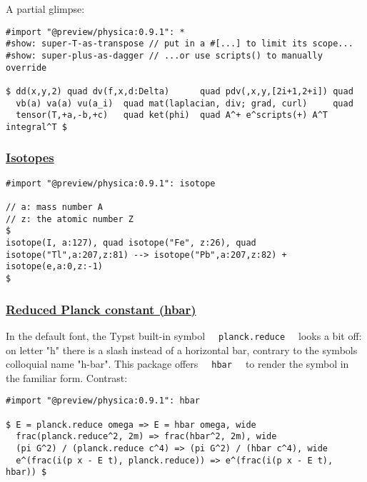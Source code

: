 A partial glimpse:

\begin{verbatim}
#import "@preview/physica:0.9.1": *
#show: super-T-as-transpose // put in a #[...] to limit its scope...
#show: super-plus-as-dagger // ...or use scripts() to manually override

$ dd(x,y,2) quad dv(f,x,d:Delta)      quad pdv(,x,y,[2i+1,2+i]) quad
  vb(a) va(a) vu(a_i)  quad mat(laplacian, div; grad, curl)     quad
  tensor(T,+a,-b,+c)   quad ket(phi)  quad A^+ e^scripts(+) A^T integral^T $
\end{verbatim}

\pandocbounded{}

\subsubsection{\texorpdfstring{\hyperref[isotopes]{Isotopes}}{Isotopes}}\label{isotopes}

\begin{verbatim}
#import "@preview/physica:0.9.1": isotope

// a: mass number A
// z: the atomic number Z
$
isotope(I, a:127), quad isotope("Fe", z:26), quad
isotope("Tl",a:207,z:81) --> isotope("Pb",a:207,z:82) + isotope(e,a:0,z:-1)
$
\end{verbatim}

\pandocbounded{}

\subsubsection{\texorpdfstring{\hyperref[reduced-planck-constant-hbar]{Reduced
Planck constant
(hbar)}}{Reduced Planck constant (hbar)}}\label{reduced-planck-constant-hbar}

In the default font, the Typst built-in symbol
\texttt{\ }{\texttt{\ planck.reduce\ }}\texttt{\ } looks a bit off: on
letter "h" there is a slash instead of a horizontal bar, contrary to the
symbol\textquotesingle s colloquial name "h-bar". This package offers
\texttt{\ }{\texttt{\ hbar\ }}\texttt{\ } to render the symbol in the
familiar form⁠. Contrast:

\begin{verbatim}
#import "@preview/physica:0.9.1": hbar

$ E = planck.reduce omega => E = hbar omega, wide
  frac(planck.reduce^2, 2m) => frac(hbar^2, 2m), wide
  (pi G^2) / (planck.reduce c^4) => (pi G^2) / (hbar c^4), wide
  e^(frac(i(p x - E t), planck.reduce)) => e^(frac(i(p x - E t), hbar)) $
\end{verbatim}

